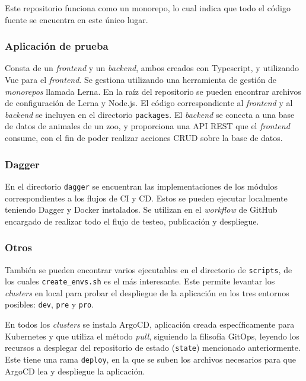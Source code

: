 Este repositorio funciona como un monorepo, lo cual indica que todo el código fuente se encuentra en este único lugar.

\subsubsection*{Aplicación de prueba}

Consta de un \textit{frontend} y un \textit{backend}, ambos creados con Typescript, y utilizando Vue para el \textit{frontend}. Se gestiona utilizando una herramienta de gestión de \textit{monorepos} llamada Lerna. En la raíz del repositorio se pueden encontrar archivos de configuración de Lerna y Node.js. El código correspondiente al \textit{frontend} y al \textit{backend} se incluyen en el directorio \texttt{packages}. El \textit{backend} se conecta a una base de datos de animales de un zoo, y proporciona una API REST que el \textit{frontend} consume, con el fin de poder realizar acciones CRUD sobre la base de datos.

\subsubsection*{Dagger}

En el directorio \texttt{dagger} se encuentran las implementaciones de los módulos correspondientes a los flujos de CI y CD. Estos se pueden ejecutar localmente teniendo Dagger y Docker instalados. Se utilizan en el \textit{workflow} de GitHub encargado de realizar todo el flujo de testeo, publicación y despliegue.

\subsubsection*{Otros}

También se pueden encontrar varios ejecutables en el directorio de \texttt{scripts}, de los cuales \texttt{create\_envs.sh} es el más interesante. Este permite levantar los \textit{clusters} en local para probar el despliegue de la aplicación en los tres entornos posibles: \texttt{dev}, \texttt{pre} y \texttt{pro}.

En todos los \textit{clusters} se instala ArgoCD, aplicación creada específicamente para Kubernetes y que utiliza el método \textit{pull}, siguiendo la filisofía GitOps, leyendo los recursos a desplegar del repositorio de estado (\texttt{state}) mencionado anteriormente. Este tiene una rama \texttt{deploy}, en la que se suben los archivos necesarios para que ArgoCD lea y despliegue la aplicación.


